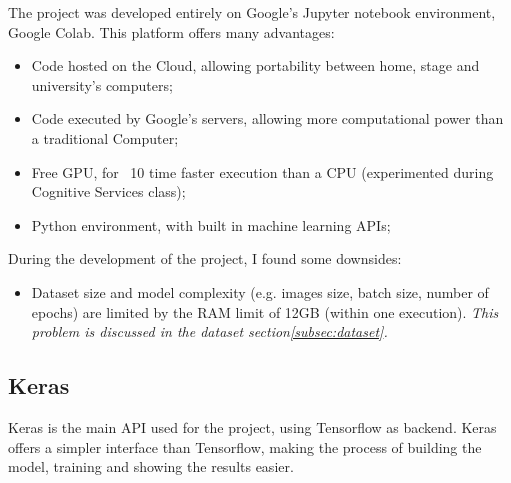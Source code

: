 \documentclass[twocolumn,showpacs,%
  nofootinbib,aps,superscriptaddress,%
  eqsecnum,prd,notitlepage,showkeys,10pt]{revtex4-1}
\begin{document}
The project was developed entirely on Google's Jupyter notebook environment, Google Colab. This platform offers many advantages:\\
\begin{itemize}
    \item Code hosted on the Cloud, allowing portability between home, stage and university's computers;
    \item Code executed by Google's servers, allowing more computational power than a traditional Computer;
    \item Free GPU, for ~10 time faster execution than a CPU (experimented during Cognitive Services class);
    \item Python environment, with built in machine learning APIs;
\end{itemize}
During the development of the project, I found some downsides:
\begin{itemize}\label{subsec:colab:downsides}
    \item Dataset size and model complexity (e.g. images size, batch size, number of epochs) are limited by the RAM limit of 12GB (within one execution). \textit{This problem is discussed in the dataset section\ref{subsec:dataset}.}
\end{itemize}

\subsection{Keras}
Keras is the main API used for the project, using Tensorflow as backend. Keras offers a simpler interface than Tensorflow, making the process of building the model, training and showing the results easier.  
\end{document}
